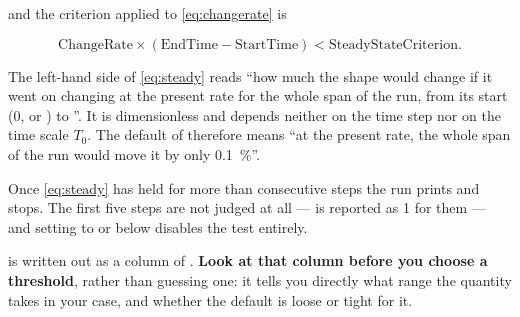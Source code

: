 and the criterion applied to \cref{eq:changerate} is

\begin{equation}\label{eq:steady}
  \mathrm{ChangeRate} \times (\mathrm{EndTime} - \mathrm{StartTime})
    < \mathrm{SteadyStateCriterion}.
\end{equation}

The left-hand side of \cref{eq:steady} reads ``how much the shape would
change if it went on changing at the present rate for the whole span of the
run, from its start ($0$, or ) to ''. It is
dimensionless and depends neither on the time step nor on the time
scale $T_0$. The default  of  therefore
means ``at the present rate, the whole span of the run would move it by only
\SI{0.1}{\percent}''.

Once \cref{eq:steady} has held for more than  consecutive
steps the run prints  and stops. The first five steps are
not judged at all ---  is reported as 1 for them --- and
setting  to  or below disables the test
entirely.

 is written out as a column of .
\textbf{Look at that column before you choose a threshold}, rather than
guessing one: it tells you directly what range the quantity takes in your case,
and whether the default is loose or tight for it.
